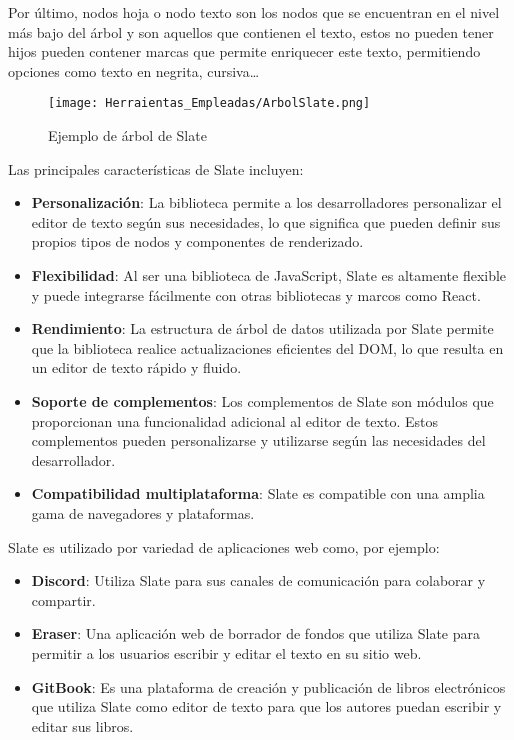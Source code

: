 Por último, nodos hoja o nodo texto son los nodos que se encuentran en el nivel más bajo del árbol y son aquellos que contienen el texto, estos no pueden tener hijos pueden contener marcas que permite enriquecer este texto, permitiendo opciones como texto en negrita, cursiva…

\begin{figure}[ht!]
  \centering
  \texttt{[image: Herraientas\_Empleadas/ArbolSlate.png]}
  \caption{Ejemplo de árbol de Slate}
  \label{fig:arbolSlate}
\end{figure}

Las principales características de Slate incluyen:

\begin{itemize}
  \item \textbf{Personalización}: La biblioteca permite a los desarrolladores personalizar el editor de texto según sus necesidades, lo que significa que pueden definir sus propios tipos de nodos y componentes de renderizado.
  \item \textbf{Flexibilidad}: Al ser una biblioteca de JavaScript, Slate es altamente flexible y puede integrarse fácilmente con otras bibliotecas y marcos como React.
  \item \textbf{Rendimiento}: La estructura de árbol de datos utilizada por Slate permite que la biblioteca realice actualizaciones eficientes del DOM, lo que resulta en un editor de texto rápido y fluido.
  \item \textbf{Soporte de complementos}: Los complementos de Slate son módulos que proporcionan una funcionalidad adicional al editor de texto. Estos complementos pueden personalizarse y utilizarse según las necesidades del desarrollador.
  \item \textbf{Compatibilidad multiplataforma}: Slate es compatible con una amplia gama de navegadores y plataformas.
\end{itemize}

Slate es utilizado por variedad de aplicaciones web como, por ejemplo:
\begin{itemize}
  \item \textbf{Discord}: Utiliza Slate para sus canales de comunicación para colaborar y compartir.
  \item \textbf{Eraser}: Una aplicación web de borrador de fondos que utiliza Slate para permitir a los usuarios escribir y editar el texto en su sitio web.
  \item \textbf{GitBook}: Es una plataforma de creación y publicación de libros electrónicos que utiliza Slate como editor de texto para que los autores puedan escribir y editar sus libros.
\end{itemize}

